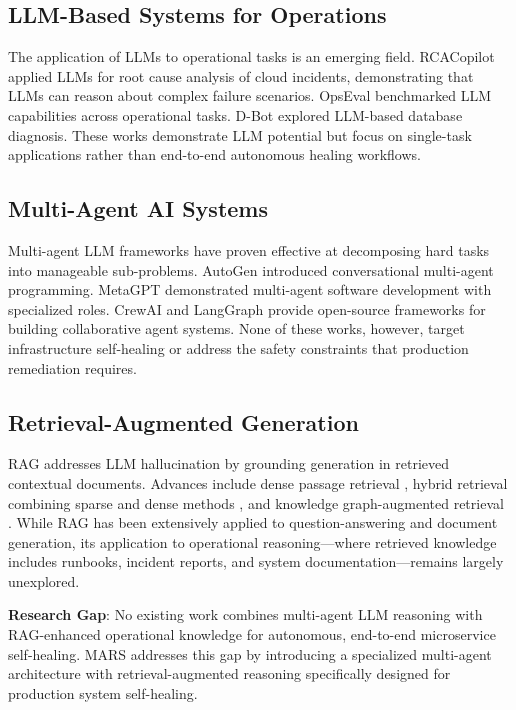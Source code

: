 \documentclass[journal]{IEEEtran}
\begin{document}
\subsection{LLM-Based Systems for Operations}

The application of LLMs to operational tasks is an emerging field. RCACopilot \cite{chen2024automatic} applied LLMs for root cause analysis of cloud incidents, demonstrating that LLMs can reason about complex failure scenarios. OpsEval \cite{liu2024opseval} benchmarked LLM capabilities across operational tasks. D-Bot \cite{zhou2024dbot} explored LLM-based database diagnosis. These works demonstrate LLM potential but focus on single-task applications rather than end-to-end autonomous healing workflows.

\subsection{Multi-Agent AI Systems}

Multi-agent LLM frameworks have proven effective at decomposing hard tasks into manageable sub-problems. AutoGen \cite{wu2023autogen} introduced conversational multi-agent programming. MetaGPT \cite{hong2024metagpt} demonstrated multi-agent software development with specialized roles. CrewAI and LangGraph provide open-source frameworks for building collaborative agent systems. None of these works, however, target infrastructure self-healing or address the safety constraints that production remediation requires.

\subsection{Retrieval-Augmented Generation}

RAG \cite{lewis2020retrieval} addresses LLM hallucination by grounding generation in retrieved contextual documents. Advances include dense passage retrieval \cite{karpukhin2020dense}, hybrid retrieval combining sparse and dense methods \cite{ma2023fine}, and knowledge graph-augmented retrieval \cite{pan2024unifying}. While RAG has been extensively applied to question-answering and document generation, its application to operational reasoning—where retrieved knowledge includes runbooks, incident reports, and system documentation—remains largely unexplored.

\textbf{Research Gap}: No existing work combines multi-agent LLM reasoning with RAG-enhanced operational knowledge for autonomous, end-to-end microservice self-healing. MARS addresses this gap by introducing a specialized multi-agent architecture with retrieval-augmented reasoning specifically designed for production system self-healing.
\end{document}
